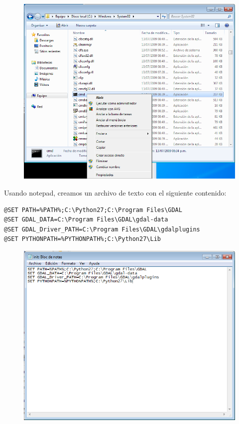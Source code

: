 \documentclass[11pt, spanish]{memoir}
\begin{document}
\begin{figure}[H]
\centering
\includegraphics[width=14cm]{acceso_directo1.png}
\end{figure}

Usando notepad, creamos un archivo de texto con el siguiente contenido:

\begin{lstlisting} 
@SET PATH=%PATH%;C:\Python27;C:\Program Files\GDAL
@SET GDAL_DATA=C:\Program Files\GDAL\gdal-data
@SET GDAL_Driver_PATH=C:\Program Files\GDAL\gdalplugins
@SET PYTHONPATH=%PYTHONPATH%;C:\Python27\Lib
\end{lstlisting}

\begin{figure}[H]
\centering
\includegraphics[width=14cm]{acceso_directo2.png}
\end{figure}
\end{document}
